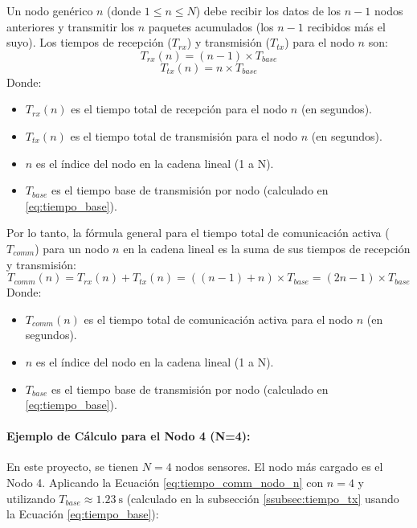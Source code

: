 Un nodo genérico $n$ (donde $1 \le n \le N$) debe recibir los datos de los $n-1$ nodos anteriores y transmitir los $n$ paquetes acumulados (los $n-1$ recibidos más el suyo). Los tiempos de recepción ($T_{rx}$) y transmisión ($T_{tx}$) para el nodo $n$ son:
\begin{equation} \label{eq:tiempo_rx_n}
T_{rx}(n) = (n-1) \times T_{base}
\end{equation}
\begin{equation} \label{eq:tiempo_tx_n}
T_{tx}(n) = n \times T_{base}
\end{equation}
Donde:
\begin{itemize}
    \item $T_{rx}(n)$ es el tiempo total de recepción para el nodo $n$ (en segundos).
    \item $T_{tx}(n)$ es el tiempo total de transmisión para el nodo $n$ (en segundos).
    \item $n$ es el índice del nodo en la cadena lineal (1 a N).
    \item $T_{base}$ es el tiempo base de transmisión por nodo (calculado en \eqref{eq:tiempo_base}).
\end{itemize}

Por lo tanto, la fórmula general para el tiempo total de comunicación activa ($T_{comm}$) para un nodo $n$ en la cadena lineal es la suma de sus tiempos de recepción y transmisión:
\begin{equation} \label{eq:tiempo_comm_nodo_n}
T_{comm}(n) = T_{rx}(n) + T_{tx}(n) = ((n-1) + n) \times T_{base} = (2n - 1) \times T_{base}
\end{equation}
Donde:
\begin{itemize}
    \item $T_{comm}(n)$ es el tiempo total de comunicación activa para el nodo $n$ (en segundos).
    \item $n$ es el índice del nodo en la cadena lineal (1 a N).
    \item $T_{base}$ es el tiempo base de transmisión por nodo (calculado en \eqref{eq:tiempo_base}).
\end{itemize}

\paragraph{Ejemplo de Cálculo para el Nodo 4 (N=4):}
En este proyecto, se tienen $N=4$ nodos sensores. El nodo más cargado es el Nodo 4. Aplicando la Ecuación \eqref{eq:tiempo_comm_nodo_n} con $n=4$ y utilizando $T_{base} \approx \SI{1.23}{\second}$ (calculado en la subsección \ref{ssubsec:tiempo_tx} usando la Ecuación \eqref{eq:tiempo_base}):

